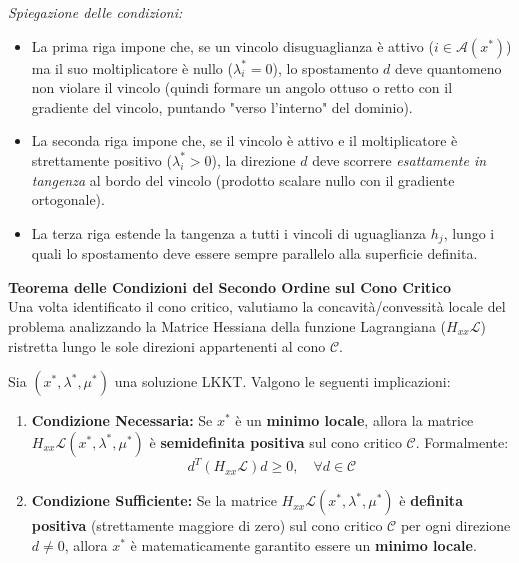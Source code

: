 \documentclass[12pt, a4paper]{article}
\newcommand{\separatore}{\noindent{\color{titlecolor!50}\rule{\textwidth}{0.6pt}}}
\begin{document}
	\textit{Spiegazione delle condizioni:}
	\begin{itemize}
		\item La prima riga impone che, se un vincolo disuguaglianza è attivo ($i \in \mathcal{A}(x^*)$) ma il suo moltiplicatore è nullo ($\lambda^*_i = 0$), lo spostamento $d$ deve quantomeno non violare il vincolo (quindi formare un angolo ottuso o retto con il gradiente del vincolo, puntando "verso l'interno" del dominio).
		\item La seconda riga impone che, se il vincolo è attivo e il moltiplicatore è strettamente positivo ($\lambda^*_i > 0$), la direzione $d$ deve scorrere \textit{esattamente in tangenza} al bordo del vincolo (prodotto scalare nullo con il gradiente ortogonale).
		\item La terza riga estende la tangenza a tutti i vincoli di uguaglianza $h_j$, lungo i quali lo spostamento deve essere sempre parallelo alla superficie definita.
	\end{itemize}
	
	\vspace{0.6cm}
	\separatore
	\vspace{0.4cm}
	
	\textbf{Teorema delle Condizioni del Secondo Ordine sul Cono Critico}\\
	Una volta identificato il cono critico, valutiamo la concavità/convessità locale del problema analizzando la Matrice Hessiana della funzione Lagrangiana ($H_{xx} \mathcal{L}$) ristretta lungo le sole direzioni appartenenti al cono $\mathcal{C}$.
	
	Sia $(x^*, \lambda^*, \mu^*)$ una soluzione LKKT. Valgono le seguenti implicazioni:
	\begin{enumerate}
		\item \textbf{Condizione Necessaria:} Se $x^*$ è un \textbf{minimo locale}, allora la matrice $H_{xx} \mathcal{L}(x^*, \lambda^*, \mu^*)$ è \textbf{semidefinita positiva} sul cono critico $\mathcal{C}$. Formalmente: 
		\[ d^T \left( H_{xx} \mathcal{L} \right) d \ge 0, \quad \forall d \in \mathcal{C} \]
		\item \textbf{Condizione Sufficiente:} Se la matrice $H_{xx} \mathcal{L}(x^*, \lambda^*, \mu^*)$ è \textbf{definita positiva} (strettamente maggiore di zero) sul cono critico $\mathcal{C}$ per ogni direzione $d \neq 0$, allora $x^*$ è matematicamente garantito essere un \textbf{minimo locale}.
	\end{enumerate}
	
	\vspace{0.6cm}
	\separatore
	\vspace{0.4cm}
	
\end{document}
